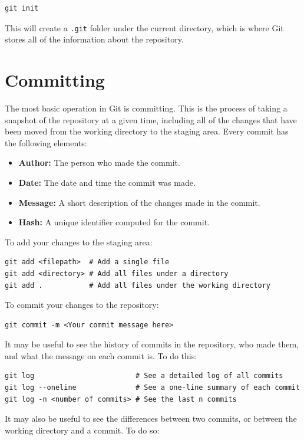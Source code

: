 \documentclass[fleqn]{article}
\begin{document}
\begin{lstlisting}
git init
\end{lstlisting}

This will create a \texttt{.git} folder under the current directory, which is
where Git stores all of the information about the repository.

\section*{Committing}
The most basic operation in Git is committing. This is the process of taking a
snapshot of the repository at a given time, including all of the changes that 
have been moved from the working directory to the staging area. Every commit
has the following elements:

\begin{itemize}
    \item \textbf{Author:} The person who made the commit.
    \item \textbf{Date:} The date and time the commit was made.
    \item \textbf{Message:} A short description of the changes made in the
                            commit.
    \item \textbf{Hash:} A unique identifier computed for the commit.
\end{itemize}

To add your changes to the staging area:
\begin{lstlisting}
git add <filepath>  # Add a single file
git add <directory> # Add all files under a directory
git add .           # Add all files under the working directory
\end{lstlisting}

To commit your changes to the repository:
\begin{lstlisting}
git commit -m <Your commit message here>
\end{lstlisting}

It may be useful to see the history of commits in the repository, who made them,
and what the message on each commit is. To do this:

\begin{lstlisting}
git log                        # See a detailed log of all commits
git log --oneline              # See a one-line summary of each commit
git log -n <number of commits> # See the last n commits
\end{lstlisting}

It may also be useful to see the differences between two commits, or between
the working directory and a commit. To do so:
\end{document}
